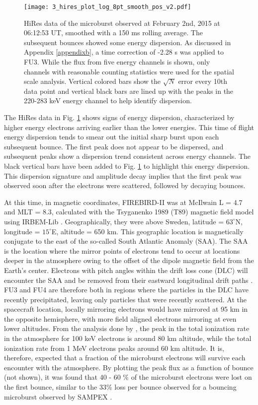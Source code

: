 \begin{figure}
\texttt{[image: 3\_hires\_plot\_log\_8pt\_smooth\_pos\_v2.pdf]}
\caption{HiRes data of the microburst observed at February 2nd, 2015 at 06:12:53 UT, smoothed with a 150 ms rolling average. The subsequent bounces showed some energy dispersion. As discussed in Appendix \ref{appendixb}, a time correction of -2.28 s was applied to FU3. While the flux from five energy channels is shown, only channels with reasonable counting statistics were used for the spatial scale analysis. Vertical colored bars show the $\sqrt{N}$ error every 10th data point and vertical black bars are lined up with the peaks in the 220-283 keV energy channel to help identify dispersion.}
\label{hires_plot}
\end{figure} 

The HiRes data in Fig. \ref{hires_plot} shows signs of energy dispersion, characterized by higher energy electrons arriving earlier than the lower energies. This time of flight energy dispersion tends to smear out the initial sharp burst upon each subsequent bounce. The first peak does not appear to be dispersed, and subsequent peaks show a dispersion trend consistent across energy channels. The black vertical bars have been added to Fig. \ref{hires_plot} to highlight this energy dispersion. This dispersion signature and amplitude decay implies that the first peak was observed soon after the electrons were scattered, followed by decaying bounces.

At this time, in magnetic coordinates, FIREBIRD-II was at McIlwain L = 4.7 and MLT = 8.3, calculated with the Tsyganenko 1989 (T89) magnetic field model \citep{Tsyganenko1989} using IRBEM-Lib \citep{irbem}. Geographically, they were above Sweden, latitude = $63^{\circ}$N, longitude = $15^{\circ}$E, altitude = 650 km. This geographic location is magnetically conjugate to the east of the so-called South Atlantic Anomaly (SAA). The SAA is the location where the mirror points of electrons tend to occur at locations deeper in the atmosphere owing to the offset of the dipole magnetic field from the Earth's center. Electrons with pitch angles within the drift loss cone (DLC) will encounter the SAA and be removed from their eastward longitudinal drift paths \citep{Comess2013, Dietrich2010}. FU3 and FU4 are therefore both in regions where the particles in the DLC have recently precipitated, leaving only particles that were recently scattered. At the spacecraft location, locally mirroring electrons would have mirrored at 95 km in the opposite hemisphere, with more field aligned electrons mirroring at even lower altitudes. From the analysis done by \citet{Fang2010}, the peak in the total ionization rate in the atmosphere for 100 keV electrons is around 80 km altitude, while the total ionization rate from 1 MeV electrons peaks around 60 km altitude. It is, therefore, expected that a fraction of the microburst electrons will survive each encounter with the atmosphere. By plotting the peak flux as a function of bounce (not shown), it was found that 40 - 60 \% of the microburst electrons were lost on the first bounce, similar to the 33\% loss per bounce observed for a bouncing microburst observed by SAMPEX \citep{Thorne2005}.

